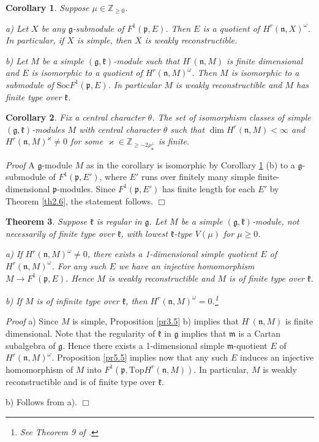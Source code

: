 \documentclass[11pt]{amsart}
\newcounter{theorem}
\newtheorem{theo}{Theorem}[section]
\newtheorem{corollary}[theo]{Corollary}
\renewenvironment{proof}{ \emph{Proof}}{$\Box$}
\newcommand{\kk}{\mathfrak{k}}
\newcommand{\nn}{\mathfrak{n}}
\newcommand{\mm}{\mathfrak{m}}
\newcommand{\pp}{\mathfrak{p}}
\renewcommand{\gg}{\mathfrak{g}}
\newcommand{\refth}[1]{Theorem \ref{#1}}
\newcommand{\refcor}[1]{Corollary \ref{#1}}
\newcommand{\refprop}[1]{Proposition \ref{#1}}
\newcommand{\Soc}{\mathrm{Soc}}
\renewcommand{\Top}{\mathrm{Top}}
\newcommand{\field}[1]{\mathbb{#1}}
\begin{document}
\begin{corollary}\label{cor5.6}
Suppose $\mu\in\field{Z}_{\geq 0}$.

a) Let $X$ be any $\gg$-submodule of $F^1(\pp,E)$. Then $E$ is a quotient of $H^r(\nn,X)^\omega$. In particular, if $X$ is simple, then $X$ is weakly reconstructible.

b) Let $M$ be a simple $(\gg,\kk)$-module such that $H^\cdot(\nn,M)$ is finite dimensional and $E$ is isomorphic to a quotient of $H^r(\nn,M)^\omega$. Then $M$ is isomorphic to a submodule of $\Soc F^1(\pp,E)$. In particular $M$ is weakly reconstructible and $M$ has finite type over $\kk$.
\end{corollary}
\begin{corollary}
Fix a central character $\theta$. The set of isomorphism classes of simple $(\gg,\kk)$-modules $M$ with central character $\theta$ such that $\dim H^r(\nn,M)<\infty$ and $H^r(\nn,M)^{\varkappa}\neq 0$ for some $\varkappa\in\field{Z}_{\geq -2 \rho_{\nn}^{\perp}}$ is finite.
\end{corollary}
\begin{proof}
A $\gg$-module $M$ as in the corollary is isomorphic by \refcor{cor5.6} (b) to a $\gg$-submodule of $F^1(\pp,E')$, where $E'$ runs over finitely many simple finite-dimensional $\pp$-modules. Since $F^1(\pp,E')$ has finite length for each $E'$ by \refth{th2.6}, the statement follows.
\end{proof}
\begin{theo}\label{th5.8}
Suppose $\kk$ is regular in $\gg$. Let $M$ be a simple $(\gg,\kk)$-module, not necessarily of finite type over $\kk$, with lowest $\kk$-type $V(\mu)$ for $\mu\geq 0$.

a) If $H^r(\nn,M)^\omega\neq 0$, there exists a 1-dimensional simple quotient $E$ of $H^r(\nn,M)^\omega$. For any such $E$ we have an injective homomorphism $M\rightarrow F^1(\pp,E)$. Hence $M$ is weakly reconstructible and $M$ is of finite type over $\kk$.

b) If $M$ is of infinite type over $\kk$, then $H^r(\nn,M)^\omega =0$.\footnote{See Theorem 9 of \cite{PZ1}.}
\end{theo}
\begin{proof}
a) Since $M$ is simple, \refprop{pr3.5} b) implies that $H^\cdot(\nn,M)$ is finite dimensional. Note that the regularity of $\kk$ in $\gg$ implies that $\mm$ is a Cartan subalgebra of $\gg$. Hence there exists a 1-dimensional simple $\mm$-quotient $E$ of $H^r(\nn,M)^\omega$. \refprop{pr5.5} implies now that any such $E$ induces an injective homomorphism of $M$ into $F^1(\pp,\Top H^r(\nn,M))$. In particular, $M$ is weakly reconstructible and is of finite type over $\kk$.

b) Follows from a).
\end{proof}
\end{document}
